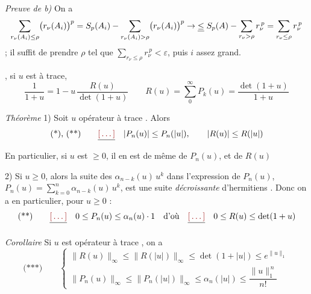 \documentclass[11pt,a4paper]{article}
\begin{document}
\emph{Preuve de b)} On a
\[
  \sum_{r_\nu(A_i) \leq \rho} \bigl(r_\nu(A_i)\bigr)^p = S_p(A_i) - \sum_{r_\nu(A_i) > \rho} \bigl(r_\nu(A_i)\bigr)^p
  \to \struck{\leq}\; S_p(A) - \sum_{r_\nu > \rho} r_\nu^{\,p} = \sum_{r_\nu \leq \rho} r_\nu^{\,p}
\]
 ; il suffit de prendre $\rho$ tel que $\sum_{r_\nu \leq \rho} r_\nu^{\,p} < \varepsilon$, puis $i$ assez grand.


, si $u$ est à trace,
\[
  \frac{1}{1+u} = 1 - u\, \frac{R(u)}{\det(1+u)} \qquad R(u) = \sum_0^\infty P_k(u) = \frac{\det(1+u)}{1+u}
\]

\emph{Théorème} 1) Soit $u$  opérateur à trace . Alors 
\[
  \text{(*), (**)}\qquad \struck{\ill{}}\quad |P_n(u)| \leq P_n(|u|),\qquad |R(u)| \leq R(|u|)
\]
 En particulier, si $u$ est $\geq 0$, il en est de même de $P_n(u)$, et de $R(u)$

2) Si $u \geq 0$, alors la suite des  $\alpha_{n-k}(u)\, u^k$ dans l'expression de $P_n(u)$, $P_n(u) = \sum_{k=0}^{n} \alpha_{n-k}(u)\, u^k$, est une suite \emph{décroissante} d'hermitiens  \struck{\ill{}}. Donc on a en particulier, pour $u \geq 0$ :
\[
  \text{(**)}\qquad \struck{\ill{}}\quad 0 \leq P_n(u) \leq \alpha_n(u) \cdot 1 \quad \text{d'où} \quad \struck{\ill{}}\quad 0 \leq R(u) \leq \det(1+u)
\]

\struck{\ill{}} \emph{Corollaire}  Si $u$ est opérateur à trace , on a 
\[
  \text{(***)}\qquad
  \begin{cases}
    \|R(u)\|_\infty \leq \|R(|u|)\|_\infty \leq \det(1+|u|) \leq e^{\|u\|_1} \\[4pt]
    \|P_n(u)\|_\infty \leq \|P_n(|u|)\|_\infty \leq \alpha_n(|u|) \leq \dfrac{\|u\|_1^{\,n}}{n!}
  \end{cases}
\]
\end{document}
